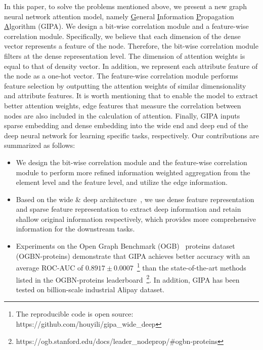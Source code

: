 \documentclass[runningheads]{llncs}
\newcommand{\model}{GIPA\xspace}
\begin{document}
In this paper, to solve the problems mentioned above, we present a new graph neural network attention model, namely \underline{G}eneral \underline{I}nformation \underline{P}ropagation \underline{A}lgorithm (\model). We design a bit-wise correlation module and a feature-wise correlation module. Specifically, we believe that each dimension of the dense vector represents a feature of the node. Therefore, the bit-wise correlation module filters at the dense representation level. The dimension of attention weights is equal to that of density vector. In addition, we represent each attribute feature of the node as a one-hot vector. The feature-wise correlation module performs feature selection by outputting the attention weights of similar dimensionality and attribute features. It is worth mentioning that to enable the model to extract better attention weights, edge features that measure the correlation between nodes are also included in the calculation of attention. Finally, \model inputs sparse embedding and dense embedding into the wide end and deep end of the deep neural network for learning specific tasks, respectively. 
Our contributions are summarized as follows:
\begin{itemize}
  \item[1)]
We design the bit-wise correlation module and the feature-wise correlation module to perform more refined information weighted aggregation from the element level and the feature level, and utilize the edge information.
  \item[2)]
 Based on the wide \& deep architecture~\cite{WideDeep}, we use dense feature representation and sparse feature representation to extract deep information and retain shallow original information respectively, which provides more comprehensive information for the downstream tasks. 
 \item[3)]
 Experiments on the Open Graph Benchmark (OGB)~\cite{hu2020open} proteins dataset (OGBN-proteins) demonstrate that \model achieves better accuracy with an average ROC-AUC of $0.8917\pm 0.0007$~\footnote{The reproducible code is open source: https://github.com/houyili/gipa\_wide\_deep} than the state-of-the-art methods listed in the OGBN-proteins leaderboard~\footnote{https://ogb.stanford.edu/docs/leader\_nodeprop/\#ogbn-proteins}.
 In addition, \model has been tested on billion-scale industrial Alipay dataset.
 
\end{itemize}
\end{document}
